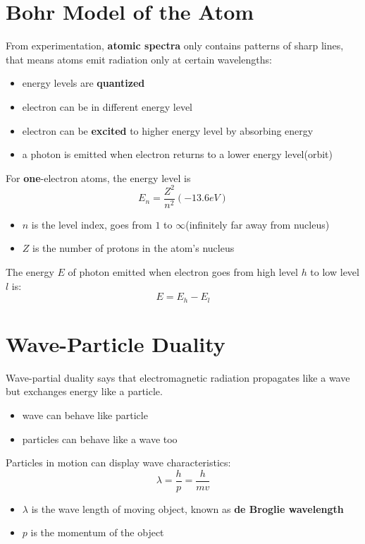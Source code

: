 \documentclass[10pt,a4paper,oneside]{article}
\begin{document}
\section{Bohr Model of the Atom}
From experimentation, \textbf{atomic spectra} only contains patterns of sharp lines, that means atoms emit radiation only at certain wavelengths:
\begin{itemize}
	\item energy levels are \textbf{quantized}
	\item electron can be in different energy level
	\item electron can be \textbf{excited} to higher energy level by absorbing energy
	\item a photon is emitted when electron returns to a lower energy level(orbit)
\end{itemize}
For \textbf{one}-electron atoms, the energy level is
\[
E_n = \frac{Z^2}{n^2}(-13.6eV)
\]
\begin{itemize}
	\item $n$ is the level index, goes from $1$ to $\infty$(infinitely far away from nucleus)
	\item $Z$ is the number of protons in the atom's nucleus
\end{itemize}
The energy $E$ of photon emitted when electron goes from high level $h$ to low level $l$ is:
\[
E = E_h - E_l
\]

\section{Wave-Particle Duality}
Wave-partial duality says that electromagnetic radiation propagates like a wave but exchanges energy like a particle.
\begin{itemize}
	\item wave can behave like particle
	\item particles can behave like a wave too
\end{itemize}
Particles in motion can display wave characteristics:
\[
\lambda = \frac{h}{p} = \frac{h}{mv}
\]
\begin{itemize}
	\item $\lambda$ is the wave length of moving object, known as \textbf{de Broglie wavelength}
	\item $p$ is the momentum of the object
\end{itemize}
\end{document}
